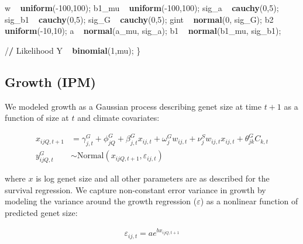 \documentclass[12pt,]{article}
\newenvironment{Shaded}{\begin{snugshade}}{\end{snugshade}}
\newcommand{\KeywordTok}[1]{\textcolor[rgb]{0.13,0.29,0.53}{\textbf{{#1}}}}
\newcommand{\DecValTok}[1]{\textcolor[rgb]{0.00,0.00,0.81}{{#1}}}
\newcommand{\StringTok}[1]{\textcolor[rgb]{0.31,0.60,0.02}{{#1}}}
\newcommand{\ErrorTok}[1]{\textbf{{#1}}}
\newcommand{\NormalTok}[1]{{#1}}
\begin{document}
\begin{Shaded}
\begin{Highlighting}[]
  \NormalTok{w ~}\StringTok{ }\KeywordTok{uniform}\NormalTok{(-}\DecValTok{100}\NormalTok{,}\DecValTok{100}\NormalTok{);}
  \NormalTok{b1_mu ~}\StringTok{ }\KeywordTok{uniform}\NormalTok{(-}\DecValTok{100}\NormalTok{,}\DecValTok{100}\NormalTok{);}
  \NormalTok{sig_a ~}\StringTok{ }\KeywordTok{cauchy}\NormalTok{(}\DecValTok{0}\NormalTok{,}\DecValTok{5}\NormalTok{);}
  \NormalTok{sig_b1 ~}\StringTok{ }\KeywordTok{cauchy}\NormalTok{(}\DecValTok{0}\NormalTok{,}\DecValTok{5}\NormalTok{);}
  \NormalTok{sig_G ~}\StringTok{ }\KeywordTok{cauchy}\NormalTok{(}\DecValTok{0}\NormalTok{,}\DecValTok{5}\NormalTok{);}
  \NormalTok{gint ~}\StringTok{ }\KeywordTok{normal}\NormalTok{(}\DecValTok{0}\NormalTok{, sig_G);}
  \NormalTok{b2 ~}\StringTok{ }\KeywordTok{uniform}\NormalTok{(-}\DecValTok{10}\NormalTok{,}\DecValTok{10}\NormalTok{);}
  \NormalTok{a ~}\StringTok{ }\KeywordTok{normal}\NormalTok{(a_mu, sig_a);}
  \NormalTok{b1 ~}\StringTok{ }\KeywordTok{normal}\NormalTok{(b1_mu, sig_b1);}

  \NormalTok{/}\ErrorTok{/}\StringTok{ }\NormalTok{Likelihood}
  \NormalTok{Y ~}\StringTok{ }\KeywordTok{binomial}\NormalTok{(}\DecValTok{1}\NormalTok{,mu);}
\NormalTok{\}}
\end{Highlighting}
\end{Shaded}

\subsection{Growth (IPM)}\label{growth-ipm}

We modeled growth as a Gaussian process describing genet size at time
$t+1$ as a function of size at $t$ and climate covariates:

\begin{align}
x_{ijQ,t+1} &= \gamma^{G}_{j,t} + \phi^{G}_{jQ} + \beta^{G}_{j,t}x_{ij,t} + \omega^{G}_{j}w_{ij,t} + \nu^{S}_{j}w_{ij,t}x_{ij,t} + \theta^{G}_{jk}C_{k,t} \\
y^{G}_{ijQ,t} &\sim \text{Normal}(x_{ijQ,t+1}, \varepsilon_{ij,t})
\end{align}

where $x$ is log genet size and all other parameters are as described
for the survival regression. We capture non-constant error variance in
growth by modeling the variance around the growth regression
($\varepsilon$) as a nonlinear function of predicted genet size:

\begin{align}
\varepsilon_{ij,t} = a e^{b x_{ijQ,t+1}}
\end{align}
\end{document}
